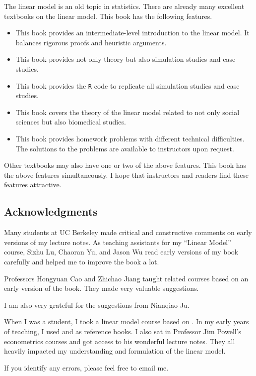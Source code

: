  
The linear model is an old topic in statistics. There are already many excellent textbooks on the linear model. This book has the following features.


\begin{itemize}
\item
This book provides an intermediate-level introduction to the linear model. It balances rigorous proofs and heuristic arguments. 

\item
This book provides not only theory but also simulation studies and case studies.

\item
This book provides the \texttt{R} code to replicate all simulation studies and case studies. 

\item
This book covers the theory of the linear model related to not only social sciences but also biomedical studies. 

\item
This book provides homework problems with different technical difficulties. The solutions to the problems are available to instructors upon request. 
\end{itemize}




Other textbooks may also have one or two of the above features. This book has the above features simultaneously. I hope that instructors and readers find these features attractive.  
 
 
 




\subsection*{Acknowledgments}



 

Many students at UC Berkeley made critical and constructive comments on early versions of my lecture notes.  As teaching assistants for my ``Linear Model'' course,  Sizhu Lu,
Chaoran Yu, 
and
Jason Wu read early versions of my book carefully and helped me to improve the book a lot. 


Professors Hongyuan Cao and Zhichao Jiang taught related courses based on an early version of the book. They made very valuable suggestions. 


I am also very grateful for the suggestions from Nianqiao Ju. 


When I was a student, I took a linear model course based on \citet{weisberg2005applied}. 
In my early years of teaching, I used \citet{christensen2002plane} and \citet{agresti2015foundations} as reference books. 
I also sat in Professor Jim Powell's econometrics courses and got access to his wonderful lecture notes. They all heavily impacted my understanding and formulation of the linear model. 


If you identify any errors, please feel free to email me.

 
 
